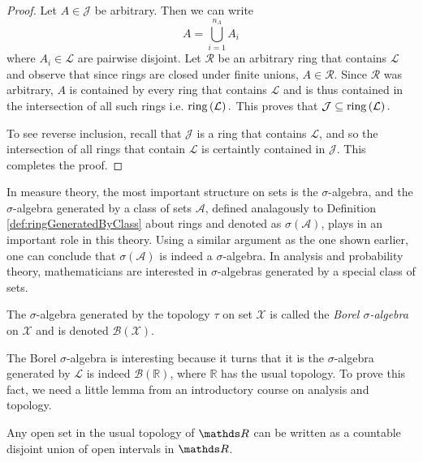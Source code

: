 \begin{proof}
Let $A\in\mathcal{J}$ be arbitrary. Then we can write 
\[
A=\bigcup_{i=1}^{n_{A}}A_{i}
\]
where $A_{i}\in\mathcal{L}$ are pairwise disjoint. Let $\mathcal{R}$
be an arbitrary ring that contains $\mathcal{L}$ and observe that
since rings are closed under finite unions, $A\in\mathcal{R}.$ Since
$\mathcal{R}$ was arbitrary, $A$ is contained by every ring that
contains $\mathcal{L}$ and is thus contained in the intersection
of all such rings i.e. $\mathrm{ring}\left(\mathcal{L}\right).$ This proves
that $\mathcal{J}\subseteq\mathrm{ring}\left(\mathcal{L}\right).$

To see reverse inclusion, recall that $\mathcal{J}$ is a ring that
contains $\mathcal{L}$, and so the intersection of all rings that
contain $\mathcal{L}$ is certaintly contained in $\mathcal{J}$.
This completes the proof.
\end{proof}
In measure theory, the most important structure on sets is the $\sigma$-algebra,
and the $\sigma$-algebra generated by a class of sets $\mathcal{A}$,
defined analagously to Definition \ref{def:ringGeneratedByClass}
about rings and denoted as $\sigma\left(\mathcal{A}\right)$, plays
in an important role in this theory. Using a similar argument as the
one shown earlier, one can conclude that $\sigma\left(\mathcal{A}\right)$
is indeed a $\sigma$-algebra. In analysis and probability theory,
mathematicians are interested in $\sigma$-algebras generated by a
special class of sets.
\begin{defn}
\label{def:borelSigma}The $\sigma$-algebra generated by the topology
$\tau$ on set $\mathcal{X}$ is called the \emph{Borel $\sigma$-algebra
}on $\mathcal{X}$ and is denoted $\mathscr{B}\left(\mathcal{X}\right)$.
\end{defn}

The Borel $\sigma$-algebra is interesting because it turns that it
is the $\sigma$-algebra generated by $\mathcal{L}$ is indeed $\mathscr{B}\left(\mathds{R}\right)$,
where $\mathds{R}$ has the usual topology. To prove this fact, we
need a little lemma from an introductory course on analysis and topology.
\begin{lem}
\label{lem:openSetDisjointUnionInterval} Any open set in the usual
topology of $\R$ can be written as a countable disjoint union of
open intervals in $\R$.
\end{lem}

